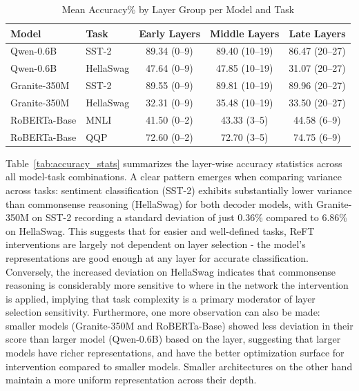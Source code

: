 \documentclass[conference]{IEEEtran}
\begin{document}
	\begin{table}[t]
		\centering
		\caption{Mean Accuracy\% by Layer Group per Model and Task}
		\label{tab:grouped_accuracy}
		\begin{tabular}{llccc}
			\hline
			\textbf{Model} & \textbf{Task} & \textbf{Early Layers} & \textbf{Middle Layers} & \textbf{Late Layers} \\
			\hline
			Qwen-0.6B    & SST-2     & 89.34 (0--9)  & 89.40 (10--19) & 86.47 (20--27) \\
			Qwen-0.6B    & HellaSwag & 47.64 (0--9)  & 47.85 (10--19) & 31.07 (20--27) \\
			Granite-350M & SST-2     & 89.55 (0--9)  & 89.81 (10--19) & 89.96 (20--27) \\
			Granite-350M & HellaSwag & 32.31 (0--9)  & 35.48 (10--19) & 33.50 (20--27) \\
			RoBERTa-Base & MNLI      & 41.50 (0--2)  & 43.33 (3--5)   & 44.58 (6--9)   \\
			RoBERTa-Base & QQP       & 72.60 (0--2)  & 72.70 (3--5)   & 74.75 (6--9)   \\
			\hline
		\end{tabular}
	\end{table}
	
	Table~\ref{tab:accuracy_stats} summarizes the layer-wise accuracy statistics across all model-task combinations. A clear pattern emerges when comparing variance across tasks: sentiment classification (SST-2) exhibits substantially lower variance than commonsense reasoning (HellaSwag) for both decoder models, with Granite-350M on SST-2 recording a standard deviation of just 0.36\%  compared to 6.86\% on HellaSwag. This suggests that for easier and well-defined tasks, ReFT interventions are largely not dependent on layer selection - the model's representations are good enough at any layer for accurate classification. Conversely, the increased deviation on HellaSwag indicates that commonsense reasoning is considerably more sensitive to where in the network the intervention is applied, implying that task complexity is a primary moderator of layer selection sensitivity. Furthermore, one more observation can also be made: smaller models (Granite-350M and RoBERTa-Base) showed less deviation in their score than larger model (Qwen-0.6B) based on the layer, suggesting that larger models have richer representations, and have the better optimization surface for intervention compared to smaller models. Smaller architectures on the other hand maintain a more uniform representation across their depth.
	
\end{document}
